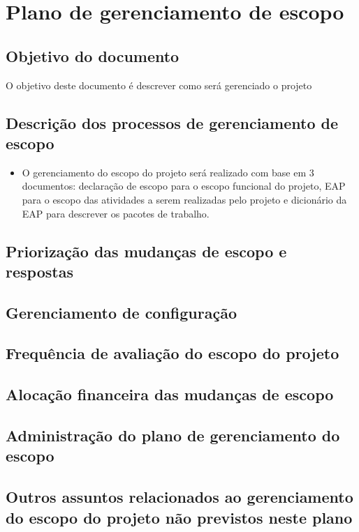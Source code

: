 \chapter{Plano de gerenciamento de escopo}

\section{Objetivo do documento}

O objetivo deste documento é descrever como será gerenciado o projeto \projectname

\section{Descrição dos processos de gerenciamento de escopo}

\begin{itemize}
	\item O gerenciamento do escopo do projeto será realizado com base em 3 documentos: declaração de escopo para o escopo funcional do projeto, EAP para o escopo das atividades a serem realizadas pelo projeto e dicionário da EAP para descrever os pacotes de trabalho.
\end{itemize}

\section{Priorização das mudanças de escopo e respostas}

\section{Gerenciamento de configuração}

\section{Frequência de avaliação do escopo do projeto}

\section{Alocação financeira das mudanças de escopo}

\section{Administração do plano de gerenciamento do escopo}

\section{Outros assuntos relacionados ao gerenciamento do escopo do projeto não previstos neste plano}

